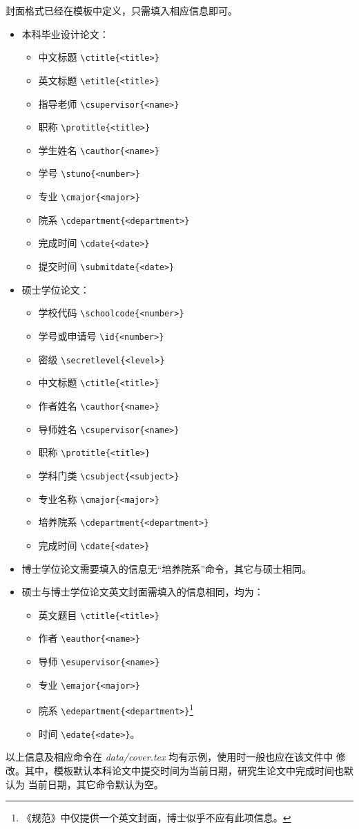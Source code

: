 封面格式已经在模板中定义，只需填入相应信息即可。
\begin{itemize}
\item 本科毕业设计论文：
  \begin{itemize}
    \item 中文标题 \verb|\ctitle{<title>}|
    \item 英文标题 \verb|\etitle{<title>}|
    \item 指导老师 \verb|\csupervisor{<name>}|
    \item 职称 \verb|\protitle{<title>}|
    \item 学生姓名 \verb|\cauthor{<name>}|
    \item 学号 \verb|\stuno{<number>}|
    \item 专业 \verb|\cmajor{<major>}|
    \item 院系 \verb|\cdepartment{<department>}|
    \item 完成时间 \verb|\cdate{<date>}|
    \item 提交时间 \verb|\submitdate{<date>}|
  \end{itemize}
\item 硕士学位论文：
  \begin{itemize}
    \item 学校代码 \verb|\schoolcode{<number>}|
    \item 学号或申请号 \verb|\id{<number>}|
    \item 密级 \verb|\secretlevel{<level>}|
    \item 中文标题 \verb|\ctitle{<title>}|
    \item 作者姓名 \verb|\cauthor{<name>}|
    \item 导师姓名 \verb|\csupervisor{<name>}|
    \item 职称 \verb|\protitle{<title>}|
    \item 学科门类 \verb|\csubject{<subject>}|
    \item 专业名称 \verb|\cmajor{<major>}|
    \item 培养院系 \verb|\cdepartment{<department>}|
    \item 完成时间 \verb|\cdate{<date>}|
  \end{itemize}
\item 博士学位论文需要填入的信息无“培养院系”命令，其它与硕士相同。
\item 硕士与博士学位论文英文封面需填入的信息相同，均为：
  \begin{itemize}
    \item 英文题目 \verb|\ctitle{<title>}|
    \item 作者 \verb|\eauthor{<name>}|
    \item 导师 \verb|\esupervisor{<name>}|
    \item 专业 \verb|\emajor{<major>}|
    \item 院系 \verb|\edepartment{<department>}|\footnote{《规范》中仅提供一个英文封面，博士似乎不应有此项信息。
}
    \item 时间 \verb|\edate{<date>}|。
  \end{itemize}
\end{itemize}
以上信息及相应命令在 \emph{data/cover.tex} 均有示例，使用时一般也应在该文件中
修改。其中，模板默认本科论文中提交时间为当前日期，研究生论文中完成时间也默认为
当前日期，其它命令默认为空。

